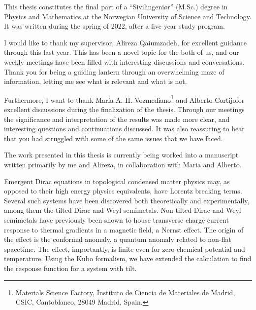 This thesis constitutes the final part of a ``Sivilingeniør'' (M.Sc.) degree in Physics and Mathematics at the Norwegian University of Science and Technology.
It was written during the spring of 2022, after a five year study program.

I would like to thank my supervisor, Alireza Qaiumzadeh, for excellent guidance through this last year.
This has been a novel topic for the both of us, and our weekly meetings have been filled with interesting discussions and conversations.
Thank you for being a guiding lantern through an overwhelming maze of information, letting me see what is relevant and what is not.

Furthermore, I want to thank
\href{https://wp.icmm.csic.es/field-theories-in-condensed-matter-physics/vozmediano/}{María A. H. Vozmediano}\footnote{Materials Science Factory, Instituto de Ciencia de Materiales de Madrid, CSIC, Cantoblanco, 28049 Madrid, Spain\label{address-of-spain}.}
and
\href{https://wp.icmm.csic.es/field-theories-in-condensed-matter-physics/alberto-cortijo/}{Alberto Cortijo}\footnotemark[1]
for excellent discussions during the finalization of the thesis.
Through our meetings the significance and interpretation of the results was made more clear, and interesting questions and continuations discussed.
It was also reassuring to hear that you had struggled with some of the same issues that we have faced.

The work presented in this thesis is currently being worked into a manuscript written primarily by me and Alireza, in collaboration with Maria and Alberto.

Emergent Dirac equations in topological condensed matter physics may, as opposed to their high energy physics equivalents, have Lorentz breaking terms.
Several such systems have been discovered both theoretically and experimentally, among them the tilted Dirac and Weyl semimetals.
Non-tilted Dirac and Weyl semimetals have previously been shown to house transverse charge current response to thermal gradients in a magnetic field, a Nernst effect.
The origin of the effect is the conformal anomaly, a quantum anomaly related to non-flat spacetime.
The effect, importantly, is finite even for zero chemical potential and temperature.
Using the Kubo formalism, we have extended the calculation to find the response function for a system with tilt.

